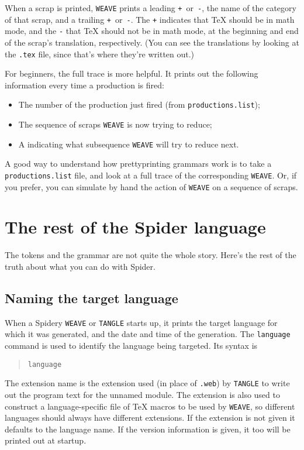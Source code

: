 When a scrap is printed, {\tt WEAVE} prints a leading
{\tt+}~or~{\tt-}, the name of the category of that scrap, and a
trailing {\tt+}~or~{\tt-}.
The {\tt+} indicates that {\TeX} should be in math mode, and the
{\tt-} that {\TeX} should not be in math mode, at the beginning and
end of the scrap's translation, respectively.
(You can see the translations by looking at the {\tt.tex} file, since
that's where they're written out.)

For beginners, the full trace is more helpful.
It prints out the following information every time a production is
fired:
\begin{itemize}
\item
The number of the production just fired (from {\tt productions.list});
\item
The sequence of scraps {\tt WEAVE} is now trying to reduce;
\item
A {\tt*} indicating what subsequence {\tt WEAVE} will try to reduce
next.
\end{itemize}
A good way to understand how prettyprinting grammars work is to take
a {\tt productions.list} file, and look at a full trace of the
corresponding {\tt WEAVE}.
Or, if you prefer, you can simulate by hand the action of {\tt WEAVE}
on a sequence of scraps.

\section{The rest of the {Spider} language}
The tokens and the grammar are not quite the whole story.
Here's  the rest of the truth about what you can do with {Spider}.

\subsection{Naming the target language}
When a Spidery {\tt WEAVE} or {\tt TANGLE} starts up, it prints the
target language for which it was generated, and the date and time of
the generation.
The {\tt language} command is used to identify the language being
targeted.
Its syntax is
\begin{quote}
\tt language 
\\
\mbox{\qquad\qquad}
\end{quote}
The extension name is the extension used (in place of {\tt .web}) by
{\tt TANGLE} to write out the program text for the unnamed module.
The extension is also used to construct a language-specific file of
{\TeX} macros to be used by {\tt WEAVE}, so different languages should
always have different extensions.
If the extension is  not given it defaults to the language name.
If the version information is given, it too will be printed out at
startup.

